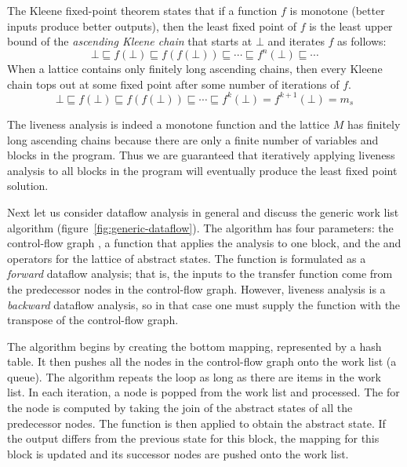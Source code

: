 \documentclass[7x10]{TimesAPriori_MIT}%
\numberwithin{theorem}{chapter}
\numberwithin{definition}{chapter}
\numberwithin{equation}{chapter}
\begin{document}
The Kleene fixed-point theorem states that if a function $f$ is
monotone (better inputs produce better outputs), then the least fixed
point of $f$ is the least upper bound of the \emph{ascending Kleene
  chain} that starts at $\bot$ and iterates $f$ as
follows:
\[
\bot \sqsubseteq f(\bot) \sqsubseteq f(f(\bot)) \sqsubseteq \cdots
  \sqsubseteq f^n(\bot) \sqsubseteq \cdots
\]
When a lattice contains only finitely long ascending chains, then
every Kleene chain tops out at some fixed point after some number of
iterations of $f$.
\[
\bot \sqsubseteq f(\bot) \sqsubseteq f(f(\bot)) \sqsubseteq \cdots
\sqsubseteq f^k(\bot) = f^{k+1}(\bot) = m_s
\]

The liveness analysis is indeed a monotone function and the lattice
$M$ has finitely long ascending chains because there are only a
finite number of variables and blocks in the program. Thus we are
guaranteed that iteratively applying liveness analysis to all blocks
in the program will eventually produce the least fixed point solution.

Next let us consider dataflow analysis in general and discuss the
generic work list algorithm (figure~\ref{fig:generic-dataflow}). 
%
The algorithm has four parameters: the control-flow graph , a
function  that applies the analysis to one block, and the
 and  operators for the lattice of abstract
states. The  function is formulated as a
\emph{forward} dataflow analysis; that is, the inputs to the transfer
function come from the predecessor nodes in the control-flow
graph. However, liveness analysis is a \emph{backward} dataflow
analysis, so in that case one must supply the 
function with the transpose of the control-flow graph.

The algorithm begins by creating the bottom mapping, represented by a
hash table.  It then pushes all the nodes in the control-flow graph
onto the work list (a queue). The algorithm repeats the 
loop as long as there are items in the work list. In each iteration, a
node is popped from the work list and processed. The  for
the node is computed by taking the join of the abstract states of all
the predecessor nodes. The  function is then applied to
obtain the  abstract state. If the output differs from
the previous state for this block, the mapping for this block is
updated and its successor nodes are pushed onto the work list.
\end{document}
